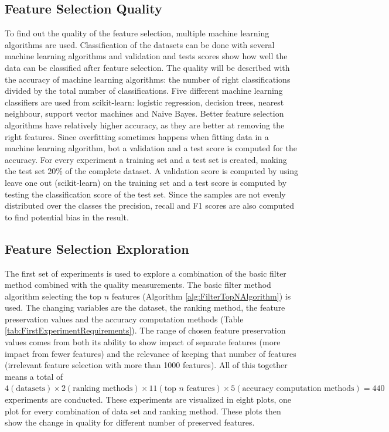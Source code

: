 \documentclass[10pt,a4paper]{article}
\begin{document}
	\subsection{Feature Selection Quality}
	\label{subsec:DimensionalityReductionQuality}
	
	To find out the quality of the feature selection, multiple machine learning algorithms are used\cite{hall1998practical}.  Classification of the datasets can be done with several machine learning algorithms and validation and tests scores show how well the data can be classified after feature selection. The quality will be described with the accuracy of machine learning algorithms: the number of right classifications divided by the total number of classifications. Five different machine learning classifiers are used from scikit-learn: logistic regression, decision trees, nearest neighbour, support vector machines and Naive Bayes. Better feature selection algorithms have relatively higher accuracy, as they are better at removing the right features. Since overfitting sometimes happens when fitting data in a machine learning algorithm, bot a validation and a test score is computed for the accuracy. For every experiment a training set and a test set is created, making the test set 20\% of the complete dataset. A validation score is computed by using leave one out (scikit-learn) on the training set and a test score is computed by testing the classification score of the test set. Since the samples are not evenly distributed over the classes the precision, recall and F1 scores are also computed to find potential bias in the result.
	
	\subsection{Feature Selection Exploration}
	\label{subsec:FeatureSelectionExploration}
	
	The first set of experiments is used to explore a combination of the basic filter method combined with the quality measurements. The basic filter method algorithm selecting the top $n$ features (Algorithm \ref{alg:FilterTopNAlgorithm}) is used. The changing variables are the dataset, the ranking method, the feature preservation values and the accuracy computation methods (Table \ref{tab:FirstExperimentRequirements}). The range of chosen feature preservation values comes from both its ability to show impact of separate features (more impact from fewer features) and the relevance of keeping that number of features (irrelevant feature selection with more than 1000 features). All of this together means a total of $4 (\text{datasets}) \times 2 (\text{ranking methods}) \times 11 (\text{top } n \text{ features}) \times 5 (\text{accuracy computation methods}) = 440$ experiments are conducted. These experiments are visualized in eight plots, one plot for every combination of data set and ranking method. These plots then show the change in quality for different number of preserved features.
	
\end{document}
